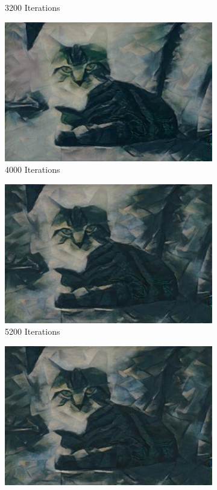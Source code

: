 \documentclass{article}
\begin{document}
\begin{figure}[H]
\begin{subfigure}{.5\textwidth}
  \caption{3200 Iterations}
  \label{fig:sfig3}
\end{subfigure}
\begin{subfigure}{.5\textwidth}
  \centering
  \includegraphics[width=.8\linewidth]{cat_dark_4000}
  \caption{4000 Iterations}
  \label{fig:sfig4}
\end{subfigure}
\begin{subfigure}{.5\textwidth}
  \centering
  \includegraphics[width=.8\linewidth]{cat_dark_5200}
  \caption{5200 Iterations}
  \label{fig:sfig5}
\end{subfigure}
\begin{subfigure}{.5\textwidth}
  \centering
  \includegraphics[width=.8\linewidth]{cat_dark_6000}

\end{subfigure}
\end{figure}
\end{document}
